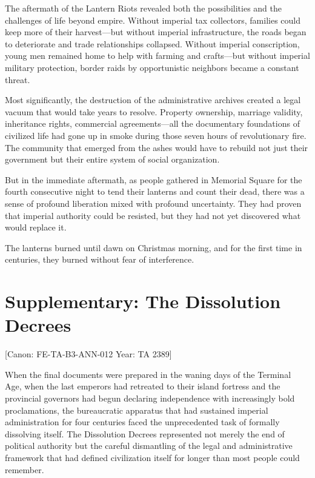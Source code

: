The aftermath of the Lantern Riots revealed both the possibilities and
the challenges of life beyond empire. Without imperial tax collectors,
families could keep more of their harvest---but without imperial
infrastructure, the roads began to deteriorate and trade relationships
collapsed. Without imperial conscription, young men remained home to
help with farming and crafts---but without imperial military protection,
border raids by opportunistic neighbors became a constant threat.

Most significantly, the destruction of the administrative archives
created a legal vacuum that would take years to resolve. Property
ownership, marriage validity, inheritance rights, commercial
agreements---all the documentary foundations of civilized life had gone
up in smoke during those seven hours of revolutionary fire. The
community that emerged from the ashes would have to rebuild not just
their government but their entire system of social organization.

But in the immediate aftermath, as people gathered in Memorial Square
for the fourth consecutive night to tend their lanterns and count their
dead, there was a sense of profound liberation mixed with profound
uncertainty. They had proven that imperial authority could be resisted,
but they had not yet discovered what would replace it.

The lanterns burned until dawn on Christmas morning, and for the first
time in centuries, they burned without fear of interference.

\section{Supplementary: The Dissolution
Decrees}\label{supplementary-the-dissolution-decrees}

{[}Canon: FE-TA-B3-ANN-012 \textbar{} Year: TA 2389{]}

When the final documents were prepared in the waning days of the
Terminal Age, when the last emperors had retreated to their island
fortress and the provincial governors had begun declaring independence
with increasingly bold proclamations, the bureaucratic apparatus that
had sustained imperial administration for four centuries faced the
unprecedented task of formally dissolving itself. The Dissolution
Decrees represented not merely the end of political authority but the
careful dismantling of the legal and administrative framework that had
defined civilization itself for longer than most people could remember.

